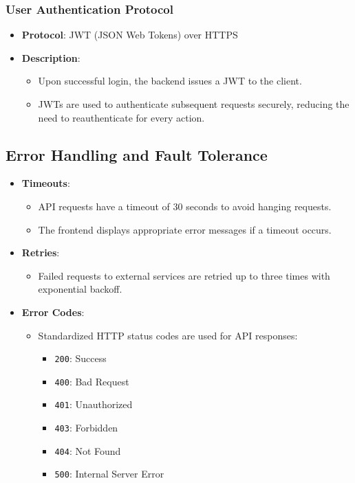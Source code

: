 \documentclass[12pt, titlepage]{article}
\begin{document}
\subsubsection*{User Authentication Protocol}
\begin{itemize}
    \item \textbf{Protocol}: JWT (JSON Web Tokens) over HTTPS
    \item \textbf{Description}:
    \begin{itemize}
        \item Upon successful login, the backend issues a JWT to the client.
        \item JWTs are used to authenticate subsequent requests securely, reducing the need to reauthenticate for every action.
    \end{itemize}
\end{itemize}

\subsection*{Error Handling and Fault Tolerance}
\begin{itemize}
    \item \textbf{Timeouts}:
    \begin{itemize}
        \item API requests have a timeout of 30 seconds to avoid hanging requests.
        \item The frontend displays appropriate error messages if a timeout occurs.
    \end{itemize}
    \item \textbf{Retries}:
    \begin{itemize}
        \item Failed requests to external services are retried up to three times with exponential backoff.
    \end{itemize}
    \item \textbf{Error Codes}:
    \begin{itemize}
        \item Standardized HTTP status codes are used for API responses:
        \begin{itemize}
            \item \texttt{200}: Success
            \item \texttt{400}: Bad Request
            \item \texttt{401}: Unauthorized
            \item \texttt{403}: Forbidden
            \item \texttt{404}: Not Found
            \item \texttt{500}: Internal Server Error
        \end{itemize}
    \end{itemize}
\end{itemize}
\end{document}
